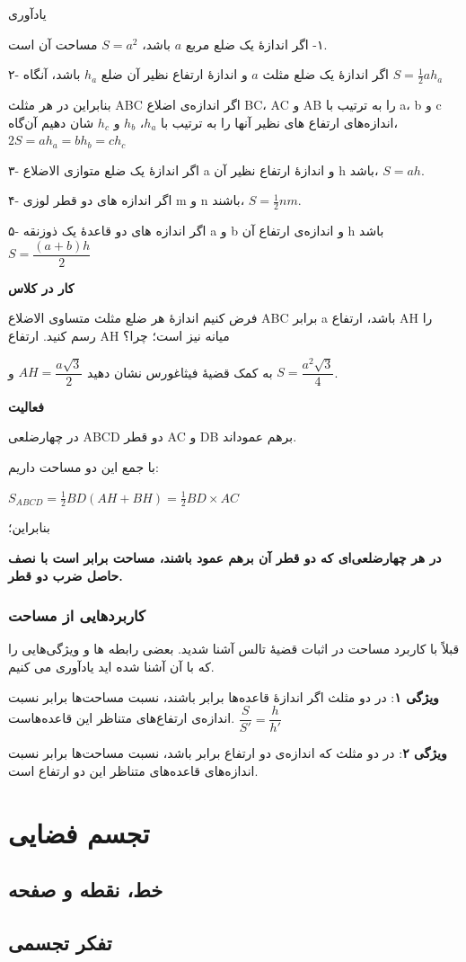 \documentclass[12pt, a4paper]{book}
\begin{document}
یادآوری

١- اگر اندازهٔ یک ضلع مربع $a$ باشد، $S=a^2$ مساحت آن است.

۲- اگر اندازهٔ یک ضلع مثلث $a$ و اندازهٔ ارتفاع نظیر آن ضلع $h_a$ باشد، آنگاه $S = \frac12 ah_a$

بنابراین در هر مثلث ABC اگر اندازه‌ی اضلاع BC، AC و AB را به ترتیب با a، b و c اندازه‌های ارتفاع های نظیر آنها را به ترتیب با $h_a$، $h_b$ و $h_c$ شان دهیم آن‌گاه، $2S = ah_a = bh_b = ch_c$

۳- اگر اندازهٔ یک ضلع متوازی الاضلاع a و اندازهٔ ارتفاع نظیر آن h باشد، $S=ah$.

۴- اگر اندازه های دو قطر لوزی m و n باشند، $S=\frac12 nm$.

۵- اگر اندازه های دو قاعدهٔ یک ذوزنقه a و b و اندازه‌ی ارتفاع آن h باشد $S = \dfrac{(a+b)h}2$
\bigskip

\textbf{کار در کلاس}

فرض کنیم اندازهٔ هر ضلع مثلث متساوی الاضلاع ABC برابر a باشد، ارتفاع AH را رسم کنید. ارتفاع AH میانه نیز است؛ چرا؟

به کمک قضیهٔ فیثاغورس نشان دهید 
$AH = \dfrac{a\sqrt{3}}2$
و 
$S = \dfrac{a^2 \sqrt{3}}{4}$.
\bigskip

\textbf{فعالیت}

در چهارضلعی ABCD دو قطر AC و DB برهم عموداند.

با جمع این دو مساحت داریم:

$S_{ABCD} = \frac12 BD (AH + BH) = \frac12 BD \times AC$

بنابراین؛

\textbf{در هر چهارضلعی‌ای که دو قطر آن برهم عمود باشند، مساحت برابر است با نصف حاصل ضرب دو قطر. }

\subsection{کاربردهایی از مساحت}
قبلاً با کاربرد مساحت در اثبات قضیهٔ تالس آشنا شدید. بعضی رابطه ها و ویژگی‌هایی را که با آن آشنا شده اید یادآوری می کنیم.
\bigskip

\textbf{ویژگی ۱}:
در دو مثلث اگر اندازۀ قاعده‌ها برابر باشند، نسبت مساحت‌ها برابر نسبت اندازه‌ی ارتفاع‌های متناظر این قاعده‌هاست.
$
	\dfrac{S}{S'} = \dfrac{h}{h'}
$
\bigskip

\textbf{ویژگی ۲}:
در دو مثلث که اندازه‌ی دو ارتفاع برابر باشد، نسبت مساحت‌ها برابر نسبت اندازه‌های قاعده‌های متناظر این دو ارتفاع است.

\chapter{تجسم فضایی}

\section{خط، نقطه و صفحه}

\section{تفکر تجسمی}
	
\end{document}
